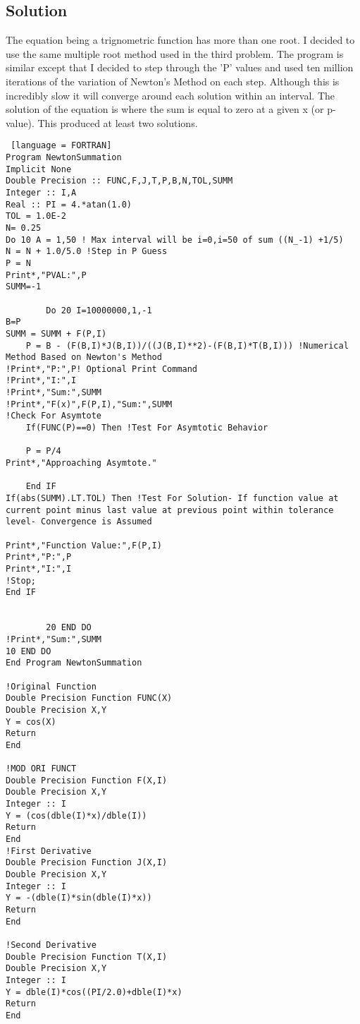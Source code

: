 \documentclass[12pt]{article}
\begin{document}
\subsection{Solution}
The equation being a trignometric function has more than one root. I decided to use the same multiple root method used in the third problem. The program is similar except that I decided to step through the 'P' values and used ten million iterations of the variation of Newton's Method on each step. Although this is incredibly slow it will converge around each solution within an interval. The solution of the equation is where the sum is equal to zero at a given x (or p-value). This produced at least two solutions. 
\begin{lstlisting} [language = FORTRAN]
Program NewtonSummation
Implicit None
Double Precision :: FUNC,F,J,T,P,B,N,TOL,SUMM
Integer :: I,A
Real :: PI = 4.*atan(1.0)
TOL = 1.0E-2
N= 0.25
Do 10 A = 1,50 ! Max interval will be i=0,i=50 of sum ((N_-1) +1/5)
N = N + 1.0/5.0 !Step in P Guess
P = N
Print*,"PVAL:",P
SUMM=-1

		Do 20 I=10000000,1,-1
B=P
SUMM = SUMM + F(P,I) 
	P = B - (F(B,I)*J(B,I))/((J(B,I)**2)-(F(B,I)*T(B,I))) !Numerical Method Based on Newton's Method
!Print*,"P:",P! Optional Print Command
!Print*,"I:",I
!Print*,"Sum:",SUMM
!Print*,"F(x)",F(P,I),"Sum:",SUMM
!Check For Asymtote
	If(FUNC(P)==0) Then !Test For Asymtotic Behavior
	
	P = P/4
Print*,"Approaching Asymtote."
	
	End IF
If(abs(SUMM).LT.TOL) Then !Test For Solution- If function value at current point minus last value at previous point within tolerance level- Convergence is Assumed

Print*,"Function Value:",F(P,I)
Print*,"P:",P
Print*,"I:",I
!Stop;
End IF


		20 END DO
!Print*,"Sum:",SUMM
10 END DO 
End Program NewtonSummation

!Original Function
Double Precision Function FUNC(X)
Double Precision X,Y
Y = cos(X)
Return
End

!MOD ORI FUNCT
Double Precision Function F(X,I)
Double Precision X,Y
Integer :: I
Y = (cos(dble(I)*x)/dble(I))
Return
End
!First Derivative
Double Precision Function J(X,I)
Double Precision X,Y
Integer :: I
Y = -(dble(I)*sin(dble(I)*x))
Return
End

!Second Derivative
Double Precision Function T(X,I)
Double Precision X,Y
Integer :: I
Y = dble(I)*cos((PI/2.0)+dble(I)*x)
Return 
End
\end{lstlisting}
\end{document}
